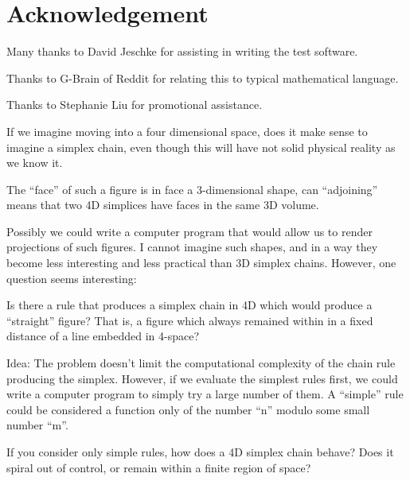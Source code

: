 \documentclass[11pt]{article}
\begin{document}
\section{Acknowledgement}

Many thanks to David Jeschke for assisting in writing the test software.

Thanks to G-Brain of Reddit for relating this to typical mathematical language.

Thanks to Stephanie Liu for promotional assistance.


If we imagine moving into a four dimensional space, does it make sense to imagine a simplex chain, even though this will have
not solid physical reality as we know it.

The ``face'' of such a figure is in face a 3-dimensional shape, can ``adjoining'' means that two 4D simplices have faces in the same 3D volume.

Possibly we could write a computer program that would allow us to render projections of such figures.
I cannot imagine such shapes, and in a way they become less interesting and less practical than 3D simplex chains.
However, one question seems interesting:

Is there a rule that produces a simplex chain in 4D which would produce a ``straight'' figure?
That is, a figure which always remained within in a fixed distance of a line embedded in 4-space?

Idea: The problem doesn't limit the computational complexity of the chain rule producing the simplex.
However, if we evaluate the simplest rules first, we could write a computer program to simply try a large number
of them. A ``simple'' rule could be considered a function only of the number ``n'' modulo some small number ``m''.

If you consider only simple rules, how does a 4D simplex chain behave? Does it spiral out of control, or remain within
a finite region of space? 




\end{document}
